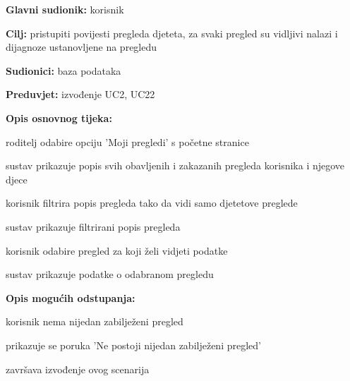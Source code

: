 					\noindent {}
					\begin{packed_item}
	
						\item \textbf{Glavni sudionik: }korisnik
						\item  \textbf{Cilj:} pristupiti povijesti pregleda djeteta, za svaki pregled su vidljivi nalazi i dijagnoze ustanovljene na pregledu
						\item  \textbf{Sudionici:} baza podataka
						\item  \textbf{Preduvjet:} izvođenje UC2, UC22
						\item  \textbf{Opis osnovnog tijeka:}
						
						\item[] \begin{packed_enum}
	
							\item roditelj odabire opciju 'Moji pregledi' s početne stranice
							\item sustav prikazuje popis svih obavljenih i zakazanih pregleda korisnika i njegove djece
							\item korisnik filtrira popis pregleda tako da vidi samo djetetove preglede
							\item sustav prikazuje filtrirani popis pregleda
							\item korisnik odabire pregled za koji želi vidjeti podatke
							\item sustav prikazuje podatke o odabranom pregledu
							
						\end{packed_enum}
						\item  \textbf{Opis mogućih odstupanja:}
						
						\item[] \begin{packed_item}
							\item[2.a] korisnik nema nijedan zabilježeni pregled
							\item[] 
							\begin{packed_enum} 
								\item prikazuje se poruka 'Ne postoji nijedan zabilježeni pregled'
								\item završava izvođenje ovog scenarija
								
							\end{packed_enum}
						\end{packed_item}
					\end{packed_item}

